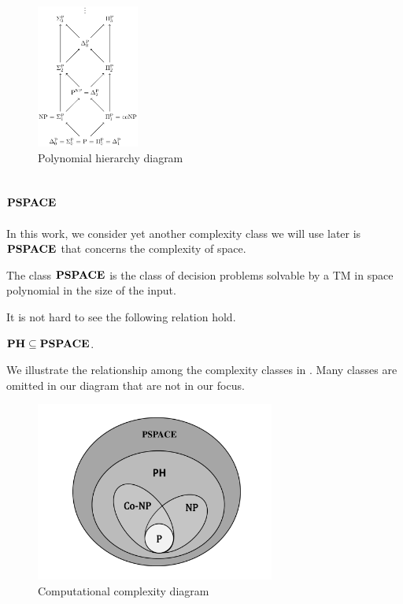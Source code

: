 \begin{figure}[h!]
  \centering
  \includegraphics[width=0.3\textwidth]{img/ph_diagram.png}
  \caption{Polynomial hierarchy diagram \label{fig:ph_diagram}}
\end{figure}


\subsection{$\textbf{PSPACE}$}
In this work, we consider yet another complexity class we will 
use later is $\textbf{PSPACE}$ that
concerns the complexity of space.

\begin{definition}
	The class $\textbf{PSPACE}$ is the class of decision problems solvable by a TM
	in space polynomial in the size of the input.
\end{definition}
It is not hard to see the following relation hold.
\begin{center}
	$\textbf{PH} \subseteq \textbf{PSPACE}$.
\end{center}

We illustrate the relationship among the complexity classes in
. Many classes are omitted in our diagram
that are not in our focus.

\begin{figure}[h!]
  \centering
  \includegraphics[width=0.7\textwidth]{img/comp_diagram.pdf}
  \caption{Computational complexity diagram \label{fig:comp_diagram}}
\end{figure}
